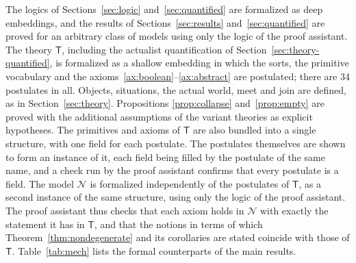 \documentclass[11pt]{amsart}
\theoremstyle{plain}
\theoremstyle{definition}
\theoremstyle{remark}
\newcommand{\T}{\mathsf{T}}
\newcommand{\N}{\mathcal{N}}
\begin{document}
The logics of Sections~\ref{sec:logic} and~\ref{sec:quantified} are
formalized as deep embeddings, and the results of
Sections~\ref{sec:results} and~\ref{sec:quantified} are proved for an
arbitrary class of models using only the logic of the proof assistant.
The theory $\T$, including the actualist quantification of
Section~\ref{sec:theory-quantified}, is formalized as a shallow
embedding in which the sorts,
the primitive vocabulary and the axioms~\ref{ax:boolean}--\ref{ax:abstract}
are postulated; there are 34 postulates in all. Objects, situations,
the actual world, meet and join are defined, as in
Section~\ref{sec:theory}. Propositions
\ref{prop:collapse} and~\ref{prop:empty} are proved with the additional
assumptions of the variant theories as explicit hypotheses. The
primitives and axioms of $\T$ are also bundled into a single structure,
with one field for each postulate. The postulates themselves are shown
to form an instance of it, each field being filled by the postulate of
the same name, and a check run by the proof assistant confirms that
every postulate is a field. The model $\N$ is formalized independently
of the postulates of $\T$, as a second instance of the same structure,
using only the logic of the proof assistant. The proof assistant thus
checks that each axiom holds in $\N$ with exactly the statement it has
in $\T$, and that the notions in terms of which
Theorem~\ref{thm:nondegenerate} and its corollaries are stated
coincide with those of $\T$. Table~\ref{tab:mech} lists the formal counterparts of the
main results.
\end{document}
